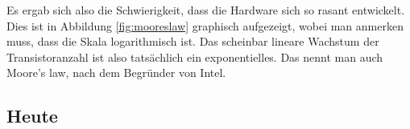 \documentclass[ngerman,abstract=true]{scrartcl}
\begin{document}
Es ergab sich also die Schwierigkeit, dass die Hardware sich so rasant entwickelt. Dies ist in Abbildung \ref{fig:mooreslaw} graphisch aufgezeigt, wobei man anmerken muss, dass die Skala logarithmisch ist. Das scheinbar lineare Wachstum der Transistoranzahl ist also tatsächlich ein exponentielles. Das nennt man auch Moore's law, nach dem Begründer von Intel.

\subsection{Heute}

\begin{figure}[p]\centering
{}
\end{figure}
\end{document}
